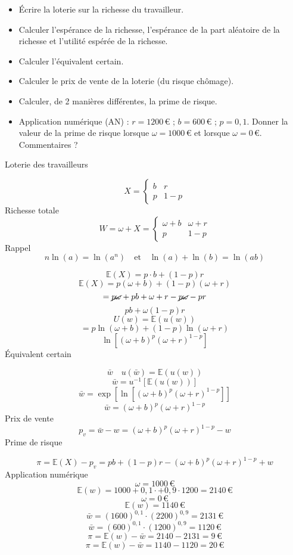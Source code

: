 \documentclass[a4paper, 12pt]{report}
\begin{document}
\begin{itemize}
	\item Écrire la loterie sur la richesse du travailleur.
	\item Calculer l'espérance de la richesse, l'espérance de la part aléatoire de la richesse et l'utilité espérée de la richesse.
	\item Calculer l'équivalent certain.
	\item Calculer le prix de vente de la loterie (du risque chômage).
	\item Calculer, de 2 manières différentes, la prime de risque.
	\item Application numérique (AN) : \( r = 1200 \, € \) ; \( b = 600 \, € \) ; \( p = 0{,}1 \). Donner la valeur de la prime de risque lorsque \( \omega = 1000 \, € \) et lorsque \( \omega = 0 \, € \). Commentaires ?
\end{itemize}
\noindent
Loterie des travailleurs

\[
X= \begin{cases} 
 b &  r  \\
 p &  1 - p
\end{cases}
\]
\noindent
Richesse totale
\[ 
W=\omega+X= \begin{cases} 
	\omega + b & \omega + r  \\
	p &  1 - p
\end{cases}
 \]
\noindent
Rappel
\[ 
n\ln(a)=\ln(a^n) \quad \text{et} \quad \ln(a)+\ln(b)=\ln(ab)
 \]

\[ 
\mathbb{E}(X)=p\cdot b  +(1-p)r
 \]
\[ 
\mathbb{E}(X)=p(\omega+b)+(1-p)(\omega+r)
 \]
\[ 
=\cancel{p\omega}+pb+\omega+r-\cancel{p\omega}-pr
\]
\[ 
pb+\omega(1-p)r
 \]
\[ 
U(w)=\mathbb{E}\left( u(w) \right) 
 \]
\[ 
=p\ln(\omega+b)+(1-p)\ln(\omega+r)
 \]
\[ 
\ln \left[(\omega+b)^{p}(\omega+r)^{1-p} \right] 
 \]
\noindent
Équivalent certain

\[ 
\bar{w} \quad u(\bar{w})=\mathbb{E}\left( u(w)\right) 
 \]
\[ 
\bar{w}=u^{-1}\left[ \mathbb{E}\left( u(w) \right)  \right] 
 \]
\[ 
\bar{w}=\exp\left[\ln\left[ (\omega+b)^{p}(\omega+r)^{1-p}\right]  \right] 
 \]
\[ 
\bar{w}= (\omega+b)^{p}(\omega+r)^{1-p}
 \]
\noindent
Prix de vente 
\[ 
p_v=\bar{w}-w=(\omega+b)^{p}(\omega+r)^{1-p}-w
 \]
\noindent
Prime de risque

\[ 
\pi=\mathbb{E}(X)-p_v=pb+(1-p)r-(\omega+b)^{p}(\omega+r)^{1-p}+w 
\]
\noindent
Application numérique\\

\noindent
\[  \omega=1000\, \text{€} \tag{1}\]
\[ 
\mathbb{E}(w)=1000+0,1\cdot+0,9\cdot1200=2140\, \text{€}
\]
\[ \omega=0\, \text{€} \tag{2} \]
\[ 
\mathbb{E}(w)=1140\, \text{€}
\]
\[ 
\bar{w}=(1600)^{0,1}\cdot(2200)^{0,9}=2131\, \text{€} \tag{1}
\]
\[ 
\bar{w}=(600)^{0,1}\cdot(1200)^{0,9}=1120\, \text{€} \tag{2}
\]
\[ 
\pi = \mathbb{E}(w)-\bar{w}=2140-2131=9\, \text{€} \tag{1} 
\]
\[ 
\pi = \mathbb{E}(w)-\bar{w}=1140-1120=20\, \text{€} \tag{2}
\]
\end{document}
